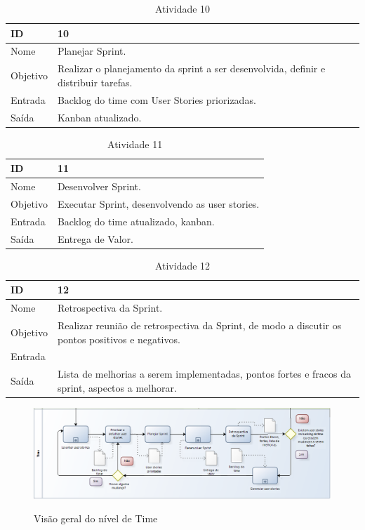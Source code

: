 \begin{table}[\htp]
\centering
\caption{Atividade 10}
\label{my-label}
\begin{tabular}{|l|l|}
\hline
ID       & 10                                             \\ \hline
Nome     & Planejar Sprint. \\ \hline
Objetivo & Realizar o planejamento da sprint a ser desenvolvida, definir e distribuir tarefas.
 \\ \hline
Entrada  &  Backlog do time com User Stories priorizadas. \\ \hline
Saída    &  Kanban atualizado.\\ \hline
\end{tabular}
\end{table}

\begin{table}[\htp]
\centering
\caption{Atividade 11}
\label{my-label}
\begin{tabular}{|l|l|}
\hline
ID       & 11                                            \\ \hline
Nome     & Desenvolver Sprint. \\ \hline
Objetivo & Executar Sprint, desenvolvendo as user stories.
 \\ \hline
Entrada  & Backlog do time atualizado, kanban. \\ \hline
Saída    &  Entrega de Valor.\\ \hline
\end{tabular}
\end{table}

\begin{table}[\htp]
\centering
\caption{Atividade 12}
\label{my-label}
\begin{tabular}{|l|l|}
\hline
ID       & 12                                           \\ \hline
Nome     & Retrospectiva da Sprint. \\ \hline
Objetivo & Realizar reunião de retrospectiva da Sprint, de modo a discutir os pontos positivos e negativos.
 \\ \hline
Entrada  & \\ \hline
Saída    &  Lista de melhorias a serem implementadas, pontos fortes e fracos da sprint, aspectos a melhorar.\\ \hline
\end{tabular}
\end{table}

\FloatBarrier
\begin{figure}[!htpd]
		\centering
		\includegraphics[scale=0.5]{figuras/Time}
		\label{img:time}
		\caption{Visão geral do nível de Time}
\end{figure}
\FloatBarrier
